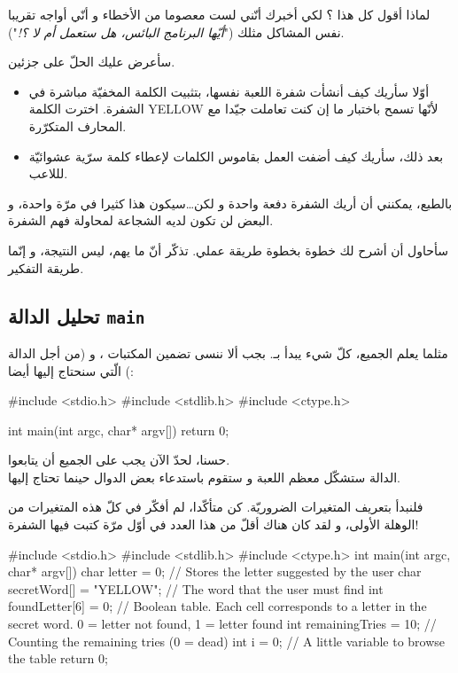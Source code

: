 لماذا أقول كل هذا ؟ لكي أخبرك أنّني لست معصوما من الأخطاء و أنّي أواجه تقريبا نفس المشاكل مثلك
("\textit{أيّها البرنامج البائس، هل ستعمل أم لا ؟!}").

سأعرض عليك الحلّ على جزئين.

\begin{itemize}
  \item أوّلا سأريك كيف أنشأت شفرة اللعبة نفسها، بتثبيت الكلمة المخفيّة مباشرة في الشفرة. اخترت الكلمة
\textenglish{YELLOW}
لأنّها تسمح باختبار ما إن كنت تعاملت جيّدا مع المحارف المتكرّرة.
  \item بعد ذلك، سأريك كيف أضفت العمل بقاموس الكلمات لإعطاء كلمة سرّية عشوائيّة لللاعب.
\end{itemize}

بالطبع، يمكنني أن أريك الشفرة دفعة واحدة و لكن\dots سيكون هذا كثيرا في مرّة واحدة، و البعض لن تكون لديه الشجاعة لمحاولة فهم الشفرة.

سأحاول أن أشرح لك خطوة بخطوة طريقة عملي. تذكّر أنّ ما يهم، ليس النتيجة، و إنّما طريقة التفكير.

\subsection{تحليل الدالة \texttt{main}}

مثلما يعلم الجميع، كلّ شيء يبدأ بـ.
بجب ألا ننسى تضمين المكتبات
،
و
(من أجل الدالة
)
الّتي سنحتاج إليها أيضا:

\begin{Csource}
#include <stdio.h>
#include <stdlib.h>
#include <ctype.h>

int main(int argc, char* argv[])
{
  return 0;
}
\end{Csource}

حسنا، لحدّ الآن يجب على الجميع أن يتابعوا.\\
الدالة
ستشكّل معظم اللعبة و ستقوم باستدعاء بعض الدوال حينما تحتاج إليها.

فلنبدأ بتعريف المتغيرات الضروريّة. كن متأكّدا، لم أفكّر في كلّ هذه المتغيرات من الوهلة الأولى، و لقد كان هناك أقلّ من هذا العدد في أوّل مرّة كتبت فيها الشفرة!

\begin{Csource}
#include <stdio.h>
#include <stdlib.h>
#include <ctype.h>
int main(int argc, char* argv[])
{
  char letter = 0; // Stores the letter suggested by the user
  char secretWord[] = "YELLOW"; // The word that the user must find
  int foundLetter[6] = {0}; // Boolean table. Each cell corresponds to a letter in the secret word. 0 = letter not found, 1 = letter found
  int remainingTries = 10; // Counting the remaining tries (0 = dead)
  int i = 0; // A little variable to browse the table
  return 0;
}
\end{Csource}

